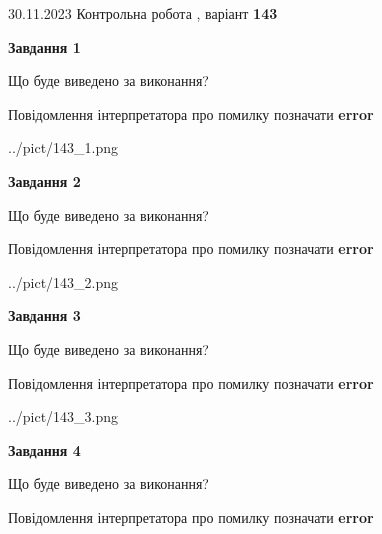 \documentclass[12pt, ukrainian]{article}
\begin{document}
{{30.11.2023 Контрольна робота , варіант  \No \textbf { 143 }\par}}
{




{\begin {center}\textbf{Завдання 1}\end {center}}\par
Що буде виведено за виконання? \par
Повідомлення інтерпретатора про помилку позначати \textbf{error}

\begin{center}
	{../pict/143_1.png}
\end{center}
\newpage

{\begin {center}\textbf{Завдання 2}\end {center}}\par
Що буде виведено за виконання? \par
Повідомлення інтерпретатора про помилку позначати \textbf{error}

\begin{center}
	{../pict/143_2.png}
\end{center}
\newpage

{\begin {center}\textbf{Завдання 3}\end {center}}\par
Що буде виведено за виконання? \par
Повідомлення інтерпретатора про помилку позначати \textbf{error}

\begin{center}
	{../pict/143_3.png}
\end{center}
\newpage

{\begin {center}\textbf{Завдання 4}\end {center}}\par
Що буде виведено за виконання? \par
Повідомлення інтерпретатора про помилку позначати \textbf{error}

}
\end{document}
